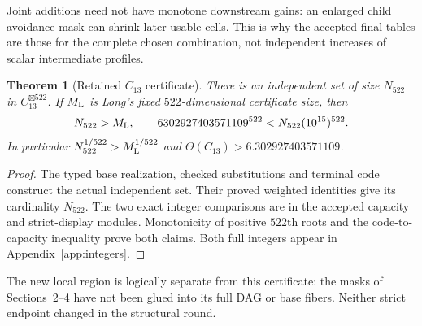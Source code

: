 \documentclass[11pt,a4paper]{article}
\newtheorem{theorem}{Theorem}[section]
\theoremstyle{definition}
\theoremstyle{remark}
\begin{document}
Joint additions need not have monotone downstream gains: an enlarged
child avoidance mask can shrink later usable cells. This is why the
accepted final tables are those for the complete chosen combination,
not independent increases of scalar intermediate profiles.

\begin{theorem}[Retained $C_{13}$ certificate]\label{thm:c13}
There is an independent set of size $N_{522}$ in
$C_{13}^{\boxtimes522}$. If $M_{\rm L}$ is Long's fixed $522$-dimensional
certificate size, then
\[
 N_{522}>M_{\rm L},\qquad
 6302927403571109^{522}<N_{522}(10^{15})^{522}.
\]
In particular $N_{522}^{1/522}>M_{\rm L}^{1/522}$ and
$\Theta(C_{13})>6.302927403571109$.
\end{theorem}
\begin{proof}
The typed base realization, checked substitutions and terminal code
construct the actual independent set. Their proved weighted identities
give its cardinality $N_{522}$. The two exact integer comparisons are
in the accepted capacity and strict-display modules. Monotonicity of
positive $522$th roots and the code-to-capacity inequality prove both
claims. Both full integers appear in Appendix~\ref{app:integers}.
\end{proof}

The new local region is logically separate from this certificate:
the masks of Sections~2--4 have not been glued into its full DAG or
base fibers. Neither strict endpoint changed in the structural round.
\end{document}
